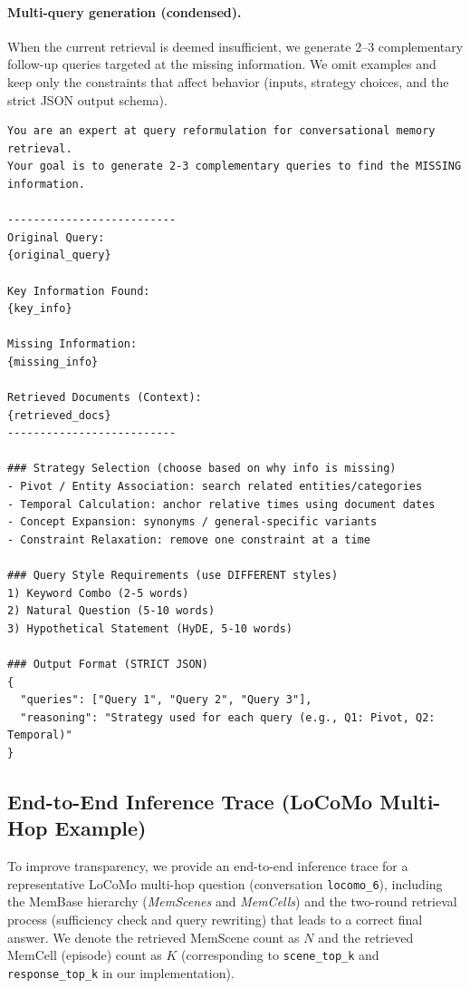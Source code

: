 \paragraph{Multi-query generation (condensed).} When the current retrieval is deemed insufficient, we generate 2--3 complementary follow-up queries targeted at the missing information. We omit examples and keep only the constraints that affect behavior (inputs, strategy choices, and the strict JSON output schema).

{\footnotesize
\begin{Verbatim}[breaklines=true,breakanywhere=true]
You are an expert at query reformulation for conversational memory retrieval.
Your goal is to generate 2-3 complementary queries to find the MISSING information.

--------------------------
Original Query:
{original_query}

Key Information Found:
{key_info}

Missing Information:
{missing_info}

Retrieved Documents (Context):
{retrieved_docs}
--------------------------

### Strategy Selection (choose based on why info is missing)
- Pivot / Entity Association: search related entities/categories
- Temporal Calculation: anchor relative times using document dates
- Concept Expansion: synonyms / general-specific variants
- Constraint Relaxation: remove one constraint at a time

### Query Style Requirements (use DIFFERENT styles)
1) Keyword Combo (2-5 words)
2) Natural Question (5-10 words)
3) Hypothetical Statement (HyDE, 5-10 words)

### Output Format (STRICT JSON)
{
  "queries": ["Query 1", "Query 2", "Query 3"],
  "reasoning": "Strategy used for each query (e.g., Q1: Pivot, Q2: Temporal)"
}
\end{Verbatim}
}

\subsection{End-to-End Inference Trace (LoCoMo Multi-Hop Example)}
\label{sec:inference_trace}

To improve transparency, we provide an end-to-end inference trace for a representative LoCoMo multi-hop question (conversation \texttt{locomo\_6}), including the MemBase hierarchy (\textit{MemScenes} and \textit{MemCells}) and the two-round retrieval process (sufficiency check and query rewriting) that leads to a correct final answer. We denote the retrieved MemScene count as \(N\) and the retrieved MemCell (episode) count as \(K\) (corresponding to \texttt{scene\_top\_k} and \texttt{response\_top\_k} in our implementation).

